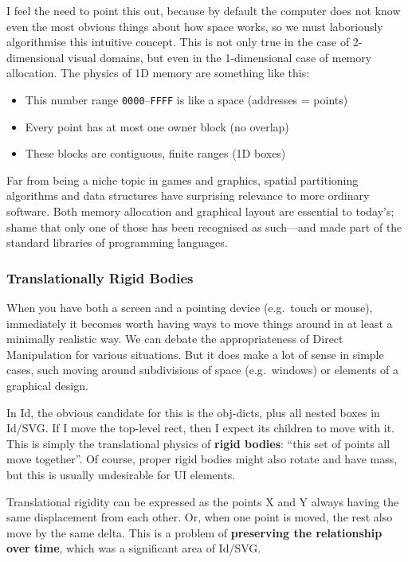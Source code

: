 I feel the need to point this out, because by default the computer does
not know even the most obvious things about how space works, so we must
laboriously algorithmise this intuitive concept. This is not only true
in the case of 2-dimensional visual domains, but even in the
1-dimensional case of memory allocation. The physics of 1D memory are
something like this:

\begin{itemize}
\tightlist
\item
  This number range \texttt{0000}--\texttt{FFFF} is like a space
  (addresses = points)
\item
  Every point has at most one owner block (no overlap)
\item
  These blocks are contiguous, finite ranges (1D boxes)
\end{itemize}

Far from being a niche topic in games and graphics, spatial partitioning
algorithms and data structures have surprising relevance to more
ordinary software. Both memory allocation and graphical layout are
essential to today's; shame that only one of those has been recognised
as such---and made part of the standard libraries of programming
languages.

\hypertarget{translationally-rigid-bodies}{%
\subsubsection{Translationally Rigid
Bodies}\label{translationally-rigid-bodies}}

When you have both a screen and a pointing device (e.g.~touch or mouse),
immediately it becomes worth having ways to move things around in at
least a minimally realistic way. We can debate the appropriateness of
Direct Manipulation for various situations. But it does make a lot of
sense in simple cases, such moving around subdivisions of space
(e.g.~windows) or elements of a graphical design.

In Id{}, the obvious candidate for this is the obj-dicts, plus all
nested boxes in Id{}/SVG. If I move the top-level rect, then I expect
its children to move with it. This is simply the translational physics
of \textbf{rigid bodies}: ``this set of points all move together''. Of
course, proper rigid bodies might also rotate and have mass, but this is
usually undesirable for UI elements.

Translational rigidity can be expressed as the points X and Y always
having the same displacement from each other. Or, when one point is
moved, the rest also move by the same delta. This is a problem of
\textbf{preserving the relationship over time}, which was a significant
area of Id{}/SVG.

